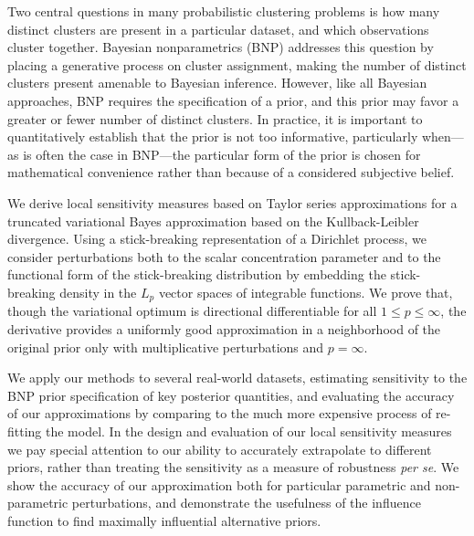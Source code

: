 Two central questions in many probabilistic clustering problems is how many
distinct clusters are present in a particular dataset, and which observations
cluster together.  Bayesian nonparametrics (BNP) addresses this question by
placing a generative process on cluster assignment, making the number of
distinct clusters present amenable to Bayesian inference. However, like all
Bayesian approaches, BNP requires the specification of a prior, and this prior
may favor a greater or fewer number of distinct clusters.  In practice, it is
important to quantitatively establish that the prior is not too informative,
particularly when---as is often the case in BNP---the particular form of the
prior is chosen for mathematical convenience rather than because of a considered
subjective belief.

We derive local sensitivity measures based on Taylor series approximations for a
truncated variational Bayes approximation based on the Kullback-Leibler
divergence.  Using a stick-breaking representation of a Dirichlet process, we
consider perturbations both to the scalar concentration parameter and to the
functional form of the stick-breaking distribution by embedding the
stick-breaking density in the $L_p$ vector spaces of integrable functions.  We
prove that, though the variational optimum is directional differentiable for all
$1 \le p \le \infty$, the derivative provides a uniformly good approximation in
a neighborhood of the original prior only with multiplicative perturbations and
$p=\infty$.

We apply our methods to several real-world datasets, estimating sensitivity to
the BNP prior specification of key posterior quantities, and evaluating the
accuracy of our approximations by comparing to the much more expensive process
of re-fitting the model.  In the design and evaluation of our local sensitivity
measures we pay special attention to our ability to accurately extrapolate to
different priors, rather than treating the sensitivity as a measure of
robustness {\em per se}.  We show the accuracy of our approximation both for
particular parametric and non-parametric perturbations, and demonstrate the
usefulness of the influence function to find maximally influential alternative
priors.
